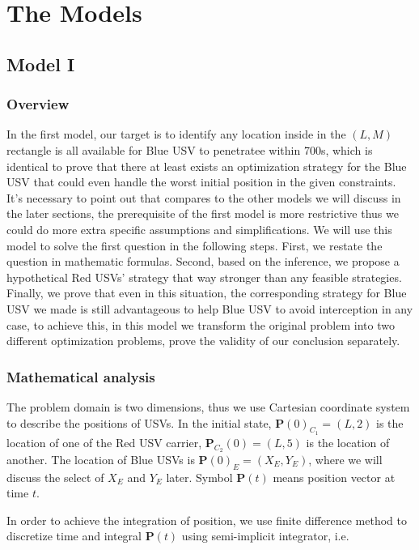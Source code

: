 \documentclass{mcmthesis}
\begin{document}
\section{The Models}

\subsection{Model I}

\subsubsection{Overview}
In the first model, our target is to identify any location inside in the $(L, M)$ rectangle is all available for Blue USV to penetratee within 700s, which is identical to prove that there at least exists an optimization strategy for the Blue USV that could even handle the worst initial position in the given constraints. It's necessary to point out that compares to the other models we will discuss in the later sections, the prerequisite of the first model is more restrictive thus we could do more extra specific assumptions and simplifications. We will use this model to solve the first question in the following steps. First, we restate the question in mathematic formulas. Second, based on the inference, we propose a hypothetical Red USVs' strategy that way stronger than any feasible strategies. Finally, we prove that even in this situation, the corresponding strategy for Blue USV we made is still advantageous to help Blue USV to avoid interception in any case, to achieve this, in this model we transform the original problem into two different optimization problems, prove the validity of our conclusion separately.

\subsubsection{Mathematical analysis}
The problem domain is two dimensions, thus we use Cartesian coordinate system to describe the positions of USVs. In the initial state, $\mathbf{P}(0)_{C_1}=(L, 2)$ is the location of one of the Red USV carrier, $\mathbf{P}_{C_2}(0)=(L, 5)$ is the location of another. The location of Blue USVs is $\mathbf{P}(0)_{E}=(X_E, Y_E)$, where we will discuss the select of $X_E$ and $Y_E$ later. Symbol $\mathbf{P}(t)$ means position vector at time $t$. \par
In order to achieve the integration of position, we use finite difference method to discretize time and integral $\mathbf{P}(t)$ using semi-implicit integrator, i.e. 
\end{document}

